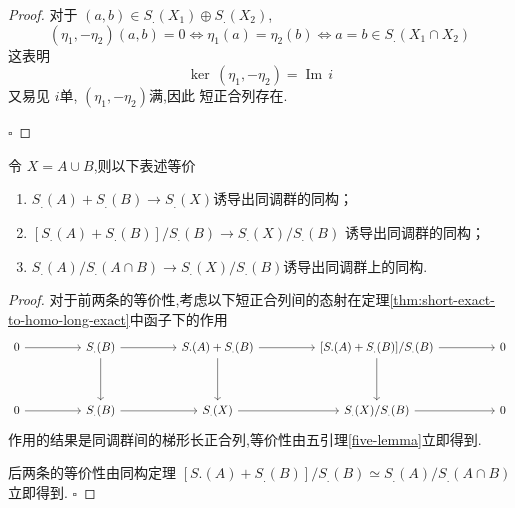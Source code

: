 \documentclass[../../几何与拓扑.tex]{subfiles}
\begin{document}
\begin{proof}
    对于 \(  \left( a,b \right) \in S_{.}\left( X_1 \right)\oplus S_{.}\left( X_2 \right)     \), \[
    \left( \eta _1 ,-\eta _2  \right)\left( a,b \right)= 0 \iff  \eta _1 \left( a \right)= \eta _2 \left( b \right)\iff a= b \in S_{.}\left( X_1\cap X_2 \right)    
    \]这表明 \[
    \operatorname{ker}\,\left( \eta _1 ,-\eta _2  \right)= \operatorname{Im}\,i 
    \]又易见 \(  i  \)单, \(  \left( \eta _1 ,-\eta _2  \right)   \)满,因此 短正合列存在.  

    \hfill $\square$
\end{proof}


\begin{lemma}
    令 \(  X =  A\cup B  \),则以下表述等价
    \begin{enumerate}
        \item \(  S_{.}\left( A \right)+ S_{.}\left( B \right)\to S_{.}\left( X \right)     \)诱导出同调群的同构；
        \item  \(  [S_{.}\left( A \right)+ S_{.}\left( B \right)  ]/S_{.}\left( B \right)\to S_{.}\left( X \right)    / S_{.}\left( B \right) \)  诱导出同调群的同构；
        \item \(  S_{.}\left( A \right)   /S_{.}\left( A\cap B \right) \to S_{.}\left( X \right) / S_{.}\left( B \right)  \)诱导出同调群上的同构. 
    \end{enumerate}
     
\end{lemma}


\begin{proof}
    对于前两条的等价性,考虑以下短正合列间的态射在定理\ref{thm:short-exact-to-homo-long-exact}中函子下的作用 
    \[\begin{tikzcd}
	0 && {S_.(B)} && {S.(A)+S_.(B)} && {[S.(A)+S_.(B)]/S_.(B)} && 0 \\
	\\
	0 && {S_.(B)} && {S_.(X)} && {S_.(X)/S_.(B)} && 0
	\arrow[from=1-1, to=1-3]
	\arrow[from=1-3, to=1-5]
	\arrow[from=1-3, to=3-3]
	\arrow[from=1-5, to=1-7]
	\arrow[from=1-5, to=3-5]
	\arrow[from=1-7, to=1-9]
	\arrow[from=1-7, to=3-7]
	\arrow[from=3-1, to=3-3]
	\arrow[from=3-3, to=3-5]
	\arrow[from=3-5, to=3-7]
	\arrow[from=3-7, to=3-9]
\end{tikzcd}\]作用的结果是同调群间的梯形长正合列,等价性由五引理\ref{five-lemma}立即得到.
   
后两条的等价性由同构定理 \(  [S.(A)+ S_{.}\left( B \right) ] /S_{.}\left( B \right)\simeq  S_{.}\left( A \right) /S_{.}\left( A\cap B \right)     \)立即得到. 
    \hfill $\square$
\end{proof}
\end{document}
